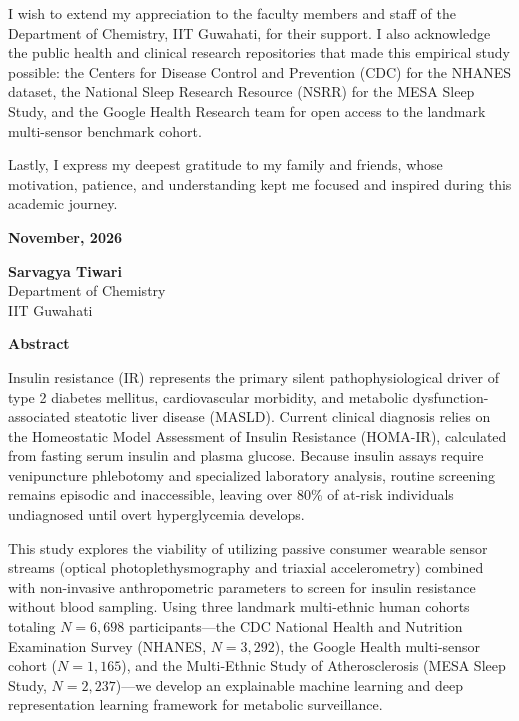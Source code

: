 \documentclass[12pt,a4paper,oneside]{report}
\begin{document}
\vspace{0.45cm}
\noindent
I wish to extend my appreciation to the faculty members and staff of the Department of Chemistry, IIT Guwahati, for their support. I also acknowledge the public health and clinical research repositories that made this empirical study possible: the Centers for Disease Control and Prevention (CDC) for the NHANES dataset, the National Sleep Research Resource (NSRR) for the MESA Sleep Study, and the Google Health Research team for open access to the landmark multi-sensor benchmark cohort.

\vspace{0.45cm}
\noindent
Lastly, I express my deepest gratitude to my family and friends, whose motivation, patience, and understanding kept me focused and inspired during this academic journey.

\vspace{2.8cm}

\noindent
\begin{minipage}[t]{0.5\textwidth}
    \textbf{November, 2026}
\end{minipage}
\hfill
\begin{minipage}[t]{0.45\textwidth}
    \raggedleft
    \textbf{Sarvagya Tiwari}\\
    Department of Chemistry\\
    IIT Guwahati
\end{minipage}

\normalsize
\newpage

\thispagestyle{plain}
\begin{center}
    {\huge \textbf{Abstract}}\\[1.0cm]
\end{center}

\noindent
Insulin resistance (IR) represents the primary silent pathophysiological driver of type 2 diabetes mellitus, cardiovascular morbidity, and metabolic dysfunction-associated steatotic liver disease (MASLD). Current clinical diagnosis relies on the Homeostatic Model Assessment of Insulin Resistance (HOMA-IR), calculated from fasting serum insulin and plasma glucose. Because insulin assays require venipuncture phlebotomy and specialized laboratory analysis, routine screening remains episodic and inaccessible, leaving over 80\% of at-risk individuals undiagnosed until overt hyperglycemia develops.

\vspace{0.35cm}
\noindent
This study explores the viability of utilizing passive consumer wearable sensor streams (optical photoplethysmography and triaxial accelerometry) combined with non-invasive anthropometric parameters to screen for insulin resistance without blood sampling. Using three landmark multi-ethnic human cohorts totaling $N = 6,698$ participants---the CDC National Health and Nutrition Examination Survey (NHANES, $N = 3,292$), the Google Health multi-sensor cohort ($N = 1,165$), and the Multi-Ethnic Study of Atherosclerosis (MESA Sleep Study, $N = 2,237$)---we develop an explainable machine learning and deep representation learning framework for metabolic surveillance.
\end{document}
